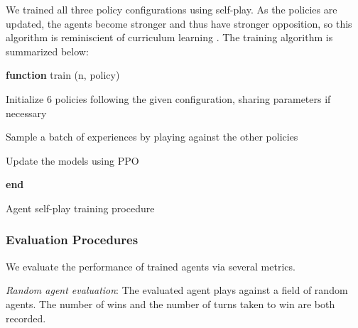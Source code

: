 \documentclass[12pt, a4paper, twocolumn]{article}
\begin{document}
We trained all three policy configurations using self-play. As the policies are updated, the agents become stronger and thus have stronger opposition, so this algorithm is reminiscient of curriculum learning \cite{CurriculumLearning}. The training algorithm is summarized below:




\begin{algorithm}

  \textbf{function} train (n, policy)

  \Indp
  
  
  Initialize 6 policies following the given configuration, sharing parameters if necessary

   {
    Sample a batch of experiences by playing against the other policies

    Update the models using PPO
  }

  \Indm
  \textbf{end}
  \caption{Agent self-play training procedure}
\end{algorithm}


\subsubsection{Evaluation Procedures}

We evaluate the performance of trained agents via several metrics.

\textit{Random agent evaluation}: The evaluated agent plays against a field of random agents. The number of wins and the number of turns taken to win are both recorded.
\end{document}
